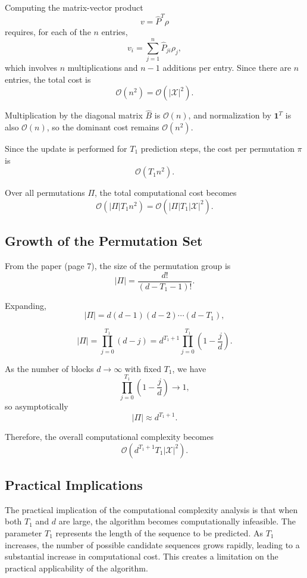 \documentclass{article}
\begin{document}
Computing the matrix-vector product
\[
v = \widehat{P}^T \rho
\]
requires, for each of the $n$ entries,
\[
v_i = \sum_{j=1}^n \widehat{P}_{ji} \rho_j,
\]
which involves $n$ multiplications and $n-1$ additions per entry. Since there are $n$ entries, the total cost is
\[
\mathcal{O}(n^2) = \mathcal{O}(|\mathcal{X}|^2).
\]

Multiplication by the diagonal matrix $\widehat{B}$ is $\mathcal{O}(n)$, and normalization by $\mathbf{1}^T$ is also $\mathcal{O}(n)$, so the dominant cost remains $\mathcal{O}(n^2)$.

Since the update is performed for $T_1$ prediction steps, the cost per permutation $\pi$ is
\[
\mathcal{O}(T_1 n^2).
\]

Over all permutations $\Pi$, the total computational cost becomes
\[
\mathcal{O}(|\Pi| T_1 n^2)
=
\mathcal{O}(|\Pi| T_1 |\mathcal{X}|^2).
\]

\subsection*{Growth of the Permutation Set}

From the paper (page 7), the size of the permutation group is
\[
|\Pi| = \frac{d!}{(d - T_1 - 1)!}.
\]

Expanding,
\[
|\Pi| = d(d-1)(d-2)\cdots(d-T_1),
\]

\[
|\Pi| = \prod_{j=0}^{T_1} (d - j)
= d^{T_1+1} \prod_{j=0}^{T_1} \left(1 - \frac{j}{d}\right).
\]

As the number of blocks $d \to \infty$ with fixed $T_1$, we have
\[
\prod_{j=0}^{T_1} \left(1 - \frac{j}{d}\right) \to 1,
\]
so asymptotically
\[
|\Pi| \approx d^{T_1+1}.
\]

Therefore, the overall computational complexity becomes
\[
\mathcal{O}(d^{T_1+1} T_1 |\mathcal{X}|^2).
\]

\subsection*{Practical Implications}

The practical implication of the computational complexity analysis is that when both $T_1$ and $d$ are large, the algorithm becomes computationally infeasible. The parameter $T_1$ represents the length of the sequence to be predicted. As $T_1$ increases, the number of possible candidate sequences grows rapidly, leading to a substantial increase in computational cost. This creates a limitation on the practical applicability of the algorithm.
\end{document}

